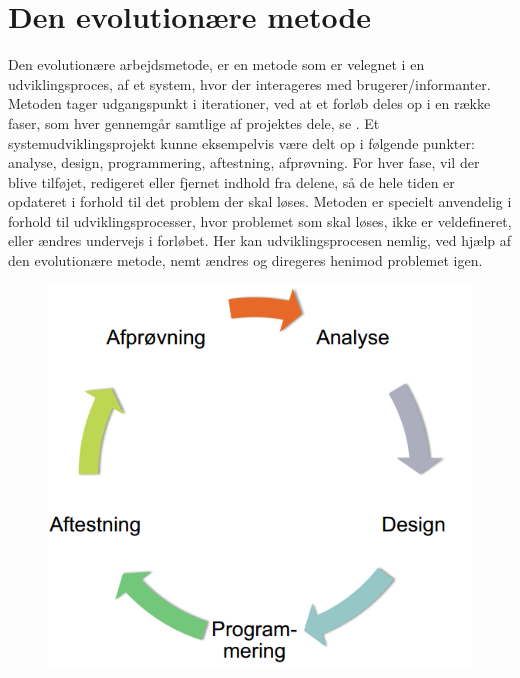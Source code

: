 \chapter{Den evolutionære metode}
\label{akademiskmetode}

Den evolutionære arbejdsmetode, er en metode som er velegnet i en udviklingsproces, af et system, hvor der interageres med brugerer/informanter. Metoden tager udgangspunkt i iterationer, ved at et forløb deles op i en række faser, som hver gennemgår samtlige af projektes dele, se . Et systemudviklingsprojekt kunne eksempelvis være delt op i følgende punkter: analyse, design, programmering, aftestning, afprøvning. For hver fase, vil der blive tilføjet, redigeret eller fjernet indhold fra delene, så de hele tiden er opdateret i forhold til det problem der skal løses. Metoden er specielt anvendelig i forhold til udviklingsprocesser, hvor problemet som skal løses, ikke er veldefineret, eller ændres undervejs i forløbet. Her kan udviklingsprocesen nemlig, ved hjælp af den evolutionære metode, nemt ændres og diregeres henimod problemet igen. 

\begin{figure}[h]
		\centering
		\includegraphics[scale=0.5]{billeder/evolutionaeremetode.png}
  		\label{fig:evolutionaeremetode}
\end{figure}

